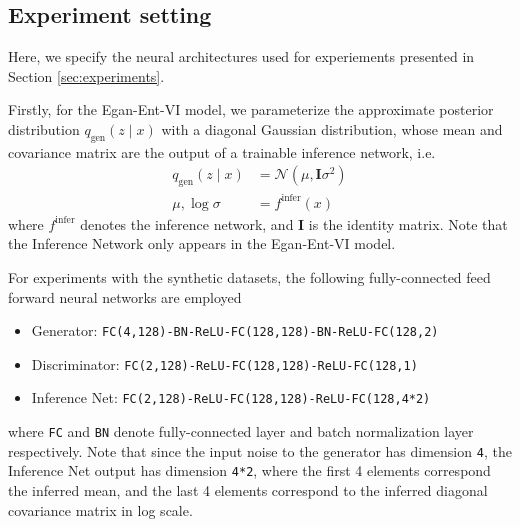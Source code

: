 \documentclass[a4paper]{article}
\newcommand{\qg}{q_\text{gen}}
\begin{document}
\subsection{Experiment setting}
\label{sec:experiment_setting}
Here, we specify the neural architectures used for experiements presented in Section \ref{sec:experiments}.

Firstly, for the Egan-Ent-VI model, we parameterize the approximate posterior distribution $\qg(z \mid x)$ with a diagonal Gaussian distribution, whose mean and covariance matrix are the output of a trainable inference network, i.e.
\begin{equation}
\begin{aligned}
\qg(z \mid x) &= \mathcal{N}(\mu, \mathbf{I}\sigma^2) \\
\mu, \log \sigma &= f^\text{infer}(x)
\end{aligned}
\end{equation}
where $f^\text{infer}$ denotes the inference network, and $\mathbf{I}$ is the identity matrix.
Note that the Inference Network only appears in the Egan-Ent-VI model.

For experiments with the synthetic datasets, the following fully-connected feed forward neural networks are employed 
{\footnotesize
\begin{itemize}[leftmargin=16pt,labelindent=16pt]
\item Generator: \texttt{FC(4,128)-BN-ReLU-FC(128,128)-BN-ReLU-FC(128,2)}
\item Discriminator: \texttt{FC(2,128)-ReLU-FC(128,128)-ReLU-FC(128,1)}
\item Inference Net: \texttt{FC(2,128)-ReLU-FC(128,128)-ReLU-FC(128,4*2)}
\end{itemize}}
where \texttt{FC} and \texttt{BN} denote fully-connected layer and batch normalization layer respectively.
Note that since the input noise to the generator has dimension \texttt{4}, the Inference Net output has dimension \texttt{4*2}, where the first 4 elements correspond the inferred mean, and the last 4 elements correspond to the inferred diagonal covariance matrix in log scale.
\end{document}
